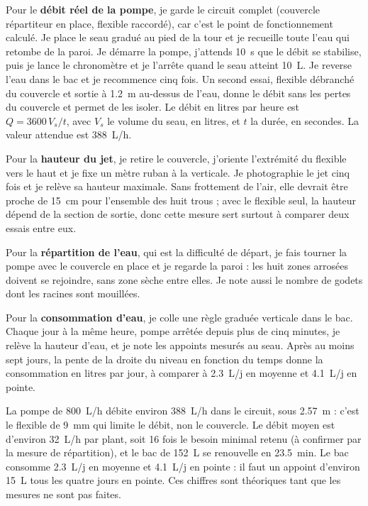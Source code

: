Pour le \textbf{débit réel de la pompe}, je garde le circuit complet (couvercle répartiteur en place, flexible raccordé), car c'est le point de fonctionnement calculé. Je place le seau gradué au pied de la tour et je recueille toute l'eau qui retombe de la paroi. Je démarre la pompe, j'attends \qty{10}{s} que le débit se stabilise, puis je lance le chronomètre et je l'arrête quand le seau atteint \qty{10}{L}. Je reverse l'eau dans le bac et je recommence cinq fois. Un second essai, flexible débranché du couvercle et sortie à \qty{1,2}{m} au-dessus de l'eau, donne le débit sans les pertes du couvercle et permet de les isoler. Le débit en litres par heure est $Q = 3600\,V_s/t$, avec $V_s$ le volume du seau, en litres, et $t$ la durée, en secondes. La valeur attendue est \qty{388}{L/h}.

Pour la \textbf{hauteur du jet}, je retire le couvercle, j'oriente l'extrémité du flexible vers le haut et je fixe un mètre ruban à la verticale. Je photographie le jet cinq fois et je relève sa hauteur maximale. Sans frottement de l'air, elle devrait être proche de \qty{15}{cm} pour l'ensemble des huit trous ; avec le flexible seul, la hauteur dépend de la section de sortie, donc cette mesure sert surtout à comparer deux essais entre eux.

Pour la \textbf{répartition de l'eau}, qui est la difficulté de départ, je fais tourner la pompe avec le couvercle en place et je regarde la paroi : les huit zones arrosées doivent se rejoindre, sans zone sèche entre elles. Je note aussi le nombre de godets dont les racines sont mouillées.

Pour la \textbf{consommation d'eau}, je colle une règle graduée verticale dans le bac. Chaque jour à la même heure, pompe arrêtée depuis plus de cinq minutes, je relève la hauteur d'eau, et je note les appoints mesurés au seau. Après au moins sept jours, la pente de la droite du niveau en fonction du temps donne la consommation en litres par jour, à comparer à \qty{2,3}{L/j} en moyenne et \qty{4,1}{L/j} en pointe.

\begin{aretenir}
La pompe de \qty{800}{L/h} débite environ \qty{388}{L/h} dans le circuit, sous \qty{2,57}{m} : c'est le flexible de \qty{9}{mm} qui limite le débit, non le couvercle. Le débit moyen est d'environ \qty{32}{L/h} par plant, soit 16 fois le besoin minimal retenu (à confirmer par la mesure de répartition), et le bac de \qty{152}{L} se renouvelle en \qty{23,5}{min}. Le bac consomme \qty{2,3}{L/j} en moyenne et \qty{4,1}{L/j} en pointe : il faut un appoint d'environ \qty{15}{L} tous les quatre jours en pointe. Ces chiffres sont théoriques tant que les mesures ne sont pas faites.
\end{aretenir}



